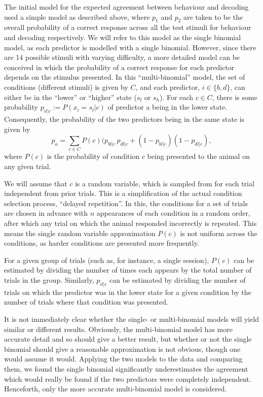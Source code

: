 The initial model for the expected agreement between behaviour and decoding used a simple model as described above, where $p_1$ and $p_2$ are taken to be the overall probability of a correct response across all the test stimuli for behaviour and decoding respectively.
We will refer to this model as the single binomial model, as each predictor is modelled with a single binomial.
However, since there are 14 possible stimuli with varying difficulty, a more detailed model can be conceived in which the probability of a correct response for each predictor depends on the stimulus presented.
In this ``multi-binomial'' model, the set of conditions (different stimuli) is given by $C$, and each predictor, $i\in\{b,d\}$, can either be in the ``lower'' or ``higher'' state ($s_l$ or $s_h$).
For each $c\in C$, there is some probability $p_{il|c} := P(x_i=s_l|c)$ of predictor a being in the lower state.
Consequently, the probability of the two predictors being in the same state is given by
$$p_a = \sum_{c\in C} P(c) (p_{bl|c} \, p_{dl|c} + (1-p_{bl|c}) (1-p_{dl|c}),$$
where $P(c)$ is the probability of condition $c$ being presented to the animal on any given trial.

We will assume that $c$ is a random variable, which is sampled from for each trial independent from prior trials.
This is a simplification of the actual condition selection process, ``delayed repetition''.
In this, the conditions for a set of trials are chosen in advance with $n$ appearances of each condition in a random order, after which any trial on which the animal responded incorrectly is repeated.
This means the single random variable approximation $P(c)$ is not uniform across the conditions, as harder conditions are presented more frequently.

For a given group of trials (such as, for instance, a single session), $P(c)$ can be estimated by dividing the number of times each appears by the total number of trials in the group.
Similarly, $p_{il|c}$ can be estimated by dividing the number of trials on which the predictor was in the lower state for a given condition by the number of trials where that condition was presented.

It is not immediately clear whether the single- or multi-binomial models will yield similar or different results.
Obviously, the multi-binomial model has more accurate detail and so should give a better result, but whether or not the single binomial should give a reasonable approximation is not obvious, though one would assume it would.
Applying the two models to the data and comparing them, we found the single binomial significantly underestimates the agreement which would really be found if the two predictors were completely independent.
Henceforth, only the more accurate multi-binomial model is considered.

